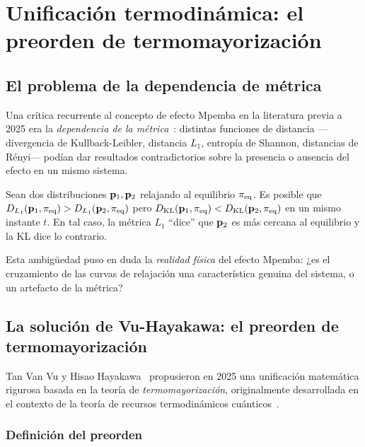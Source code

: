 \chapter{Unificación termodinámica: el preorden de termomayorización}
\label{ch:termomajorizacion}

\section{El problema de la dependencia de métrica}

Una crítica recurrente al concepto de efecto Mpemba en la literatura previa a 
2025 era la \emph{dependencia de la métrica}~\cite{burridge2016}: distintas 
funciones de distancia ---divergencia de Kullback-Leibler, distancia $L_1$, 
entropía de Shannon, distancias de Rényi--- podían dar resultados 
contradictorios sobre la presencia o ausencia del efecto en un mismo sistema.

\begin{example}
\label{ex:metric_ambiguity}
Sean dos distribuciones $\vb{p}_1, \vb{p}_2$ relajando al equilibrio $\pi_{\mathrm{eq}}$. 
Es posible que $D_{L_{1}}(\vb{p}_1, \pi_{\mathrm{eq}}) > D_{L_{1}}(\vb{p}_2, \pi_{\mathrm{eq}})$ pero 
$D_{\mathrm{KL}}(\vb{p}_1, \pi_{\mathrm{eq}}) < D_{\mathrm{KL}}(\vb{p}_2, \pi_{\mathrm{eq}})$ en un mismo instante $t$. En 
tal caso, la métrica $L_1$ ``dice'' que $\vb{p}_2$ es más cercana al equilibrio 
y la KL dice lo contrario.
\end{example}

\noindent Esta ambigüedad puso en duda la \emph{realidad física} del efecto 
Mpemba: ¿es el cruzamiento de las curvas de relajación una característica 
genuina del sistema, o un artefacto de la métrica?

\section{La solución de Vu-Hayakawa: el preorden de termomayorización}

Tan Van Vu y Hisao Hayakawa~\cite{vuhayakawa2025} propusieron en 2025 una 
unificación matemática rigurosa basada en la teoría de \emph{termomayorización}, 
originalmente desarrollada en el contexto de la teoría de recursos termodinámicos 
cuánticos~\cite{lostaglio2022}.

\subsection{Definición del preorden}

